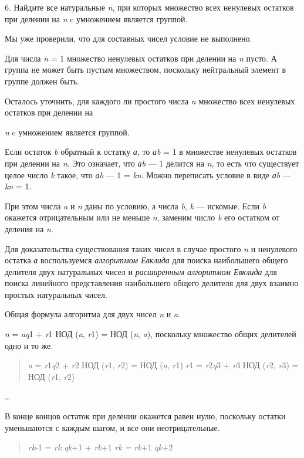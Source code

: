 \documentclass[12pt]{article}
\begin{document}
6. Найдите все натуральные \emph{n}, при которых множество всех
ненулевых остатков при делении на \emph{n} c умножением является
группой.

Мы уже проверили, что для составных чисел условие не выполнено.

Для числа \emph{n} = 1 множество ненулевых остатков при делении на
\emph{n} пусто. А группа не может быть пустым множеством, поскольку
нейтральный элемент в группе должен быть.

Осталось уточнить, для каждого ли простого числа \emph{n} множество всех
ненулевых остатков при делении на

\emph{n} c умножением является группой.

Если остаток \emph{b} обратный к остатку \emph{а}, то \emph{аb} = 1 в
множестве ненулевых остатков при делении на \emph{n}. Это означает, что
\emph{аb} --- 1 делится на \emph{n}, то есть что существует целое число
\emph{k} такое, что \emph{аb} --- 1 = \emph{kn}. Можно переписать условие
в виде \emph{аb} --- \emph{kn} = 1.

При этом числа \emph{a} и \emph{n} даны по условию, а числа \emph{b},
\emph{k} --- искомые. Если \emph{b} окажется отрицательным или не меньше
\emph{n}, заменим число \emph{b} его остатком от деления на \emph{n}.

Для доказательства существования таких чисел в случае простого \emph{n}
и ненулевого остатка \emph{а} воспользуемся \emph{алгоритмом Евклида}
для поиска наибольшего общего делителя двух натуральных чисел и
\emph{расширенным алгоритмом Евклида} для поиска линейного представления
наибольшего общего делителя для двух взаимно простых натуральных чисел.

Общая формула алгоритма для двух чисел \emph{n} и \emph{a}.

\emph{n} = \emph{aq}1 + \emph{r}1 НОД (\emph{a}, \emph{r}1) = НОД
(\emph{n}, \emph{a}), поскольку множество общих делителей одно и то же.

\begin{quote}
    \emph{a} = \emph{r}1\emph{q}2 + \emph{r}2 НОД (\emph{r}1, \emph{r}2) =
    НОД (\emph{a}, \emph{r}1) \emph{r}1 = \emph{r}2\emph{q}3 + \emph{r}3 НОД
    (\emph{r}2, \emph{r}3) = НОД (\emph{r}1, \emph{r}2)
\end{quote}

\ldots{}

В конце концов остаток при делении окажется равен нулю, поскольку
остатки уменьшаются с каждым шагом, и все они неотрицательные.

\begin{quote}
    \emph{rk}-1 = \emph{rk qk}+1 + \emph{rk}+1 \emph{rk = rk}+1 \emph{qk}+2
\end{quote}
\end{document}
